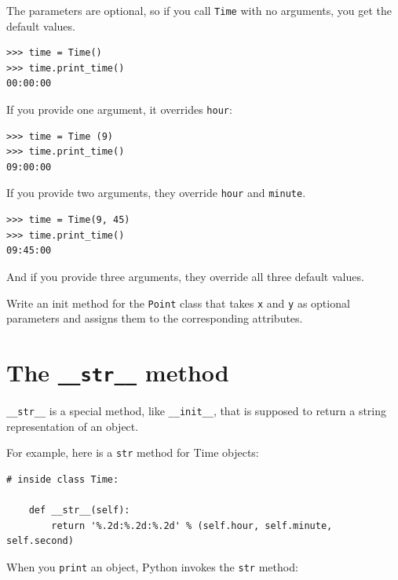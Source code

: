 \documentclass[10pt]{book}
\begin{document}

The parameters are optional, so if you call {\tt Time} with
no arguments, you get the default values.

\beforeverb
\begin{verbatim}
>>> time = Time()
>>> time.print_time()
00:00:00
\end{verbatim}
\afterverb
%
If you provide one argument, it overrides {\tt hour}:

\beforeverb
\begin{verbatim}
>>> time = Time (9)
>>> time.print_time()
09:00:00
\end{verbatim}
\afterverb
%
If you provide two arguments, they override {\tt hour} and
{\tt minute}.

\beforeverb
\begin{verbatim}
>>> time = Time(9, 45)
>>> time.print_time()
09:45:00
\end{verbatim}
\afterverb
%
And if you provide three arguments, they override all three
default values.


\begin{ex}

Write an init method for the {\tt Point} class that takes
{\tt x} and {\tt y} as optional parameters and assigns
them to the corresponding attributes.
\end{ex}


\section{The {\tt \_\_str\_\_} method}


\verb"__str__" is a special method, like \verb"__init__",
that is supposed to return a string representation of an object.


For example, here is a {\tt str} method for Time objects:

\beforeverb
\begin{verbatim}
# inside class Time:

    def __str__(self):
        return '%.2d:%.2d:%.2d' % (self.hour, self.minute, self.second)
\end{verbatim}
\afterverb
%
When you {\tt print} an object, Python invokes the {\tt str} method:
\end{document}
